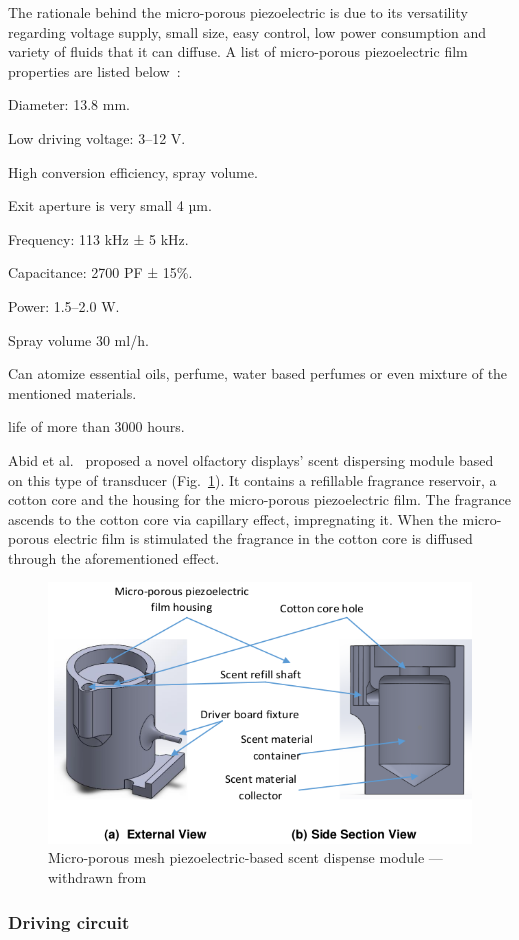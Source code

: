 The rationale behind the micro-porous piezoelectric is due to its
versatility regarding voltage supply, small size, easy control, low power
consumption and variety of fluids that it can diffuse.
A list of micro-porous piezoelectric film properties are listed below~\cite{wen2019development}:
\begin{enum-c}
\item Diameter: 13.8 mm.
\item Low driving voltage: 3--12 V.
\item High conversion efficiency, spray volume.
\item Exit aperture is very small 4 µm.
\item Frequency: 113 kHz ± 5 kHz.
\item Capacitance: 2700 PF ± 15\%.
\item Power: 1.5--2.0 W.
\item Spray volume 30 ml/h.
\item Can atomize essential oils, perfume, water based perfumes or even mixture
  of the mentioned materials.
\item life of more than 3000 hours.
\end{enum-c}

Abid et al.~\cite{abid2015novel} proposed a novel olfactory displays' scent
dispersing module based on this type of transducer
(Fig.~\ref{fig:novel-olfactory-scent-elem}). It contains a refillable fragrance
reservoir, a cotton core and the housing for the micro-porous piezoelectric
film. The fragrance ascends to the cotton core via capillary effect,
impregnating it. When the micro-porous electric film is stimulated the fragrance
in the cotton core is diffused through the aforementioned effect.
%
\begin{figure}[htb!]
\centering
    \includegraphics[width=0.65\columnwidth]{./img/novel-olfactory-scent-elem.png}
  \caption{Micro-porous mesh piezoelectric-based scent dispense module --- withdrawn from~\cite{abid2015novel}}%
\label{fig:novel-olfactory-scent-elem}
\end{figure}

\subsubsection{Driving circuit}
\label{sec:driving-circuit}



